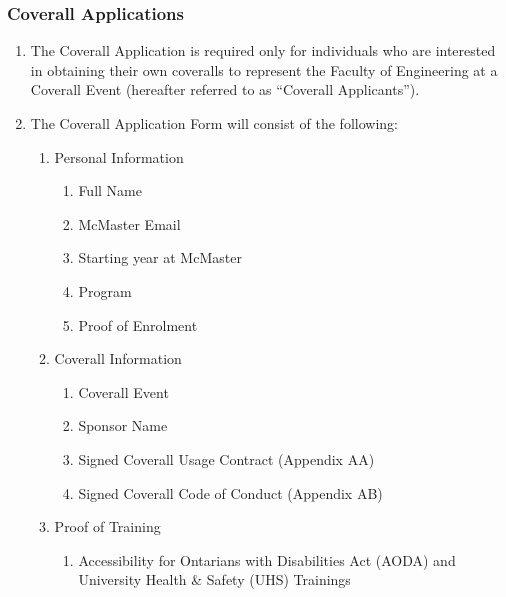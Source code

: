 \subsubsection{Coverall Applications}
\label{coverall-applications}
\begin{enumerate}
 \item
  The Coverall Application is required only for individuals who are interested in obtaining their own coveralls to represent the Faculty of Engineering at a Coverall Event (hereafter referred to as ``Coverall Applicants'').
 \item
  The Coverall Application Form will consist of the following:

  \begin{enumerate}
   \item
    Personal Information

    \begin{enumerate}
     \item
      Full Name
     \item
      McMaster Email
     \item
      Starting year at McMaster
     \item
      Program
     \item
      Proof of Enrolment
    \end{enumerate}
   \item
    Coverall Information

    \begin{enumerate}
     \item
      Coverall Event
     \item
      Sponsor Name
     \item
      Signed Coverall Usage Contract (Appendix AA)
     \item
      Signed Coverall Code of Conduct (Appendix AB)
    \end{enumerate}
   \item
    Proof of Training

    \begin{enumerate}
     \item
      Accessibility for Ontarians with Disabilities Act (AODA) and University Health \& Safety (UHS) Trainings


\end{enumerate}
\end{enumerate}
\end{enumerate}
